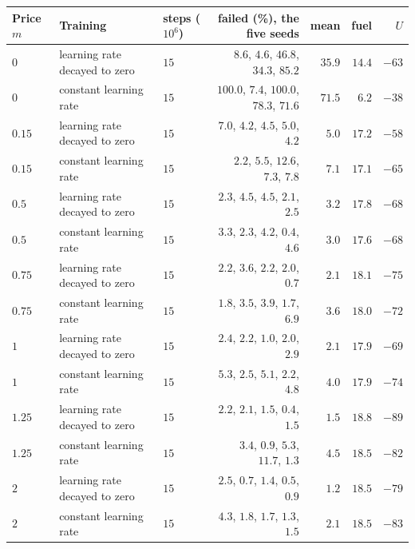\begin{tabular}{lllrrrr}
\toprule
Price $m$ & Training & steps ($10^6$) & failed (\%), the five seeds & mean & fuel & $U$ \\
\midrule
$0$ & learning rate decayed to zero & $15$ & $8.6$, $4.6$, $46.8$, $34.3$, $85.2$ & $35.9$ & $14.4$ & $-63$ \\
$0$ & constant learning rate & $15$ & $100.0$, $7.4$, $100.0$, $78.3$, $71.6$ & $71.5$ & $6.2$ & $-38$ \\
$0.15$ & learning rate decayed to zero & $15$ & $7.0$, $4.2$, $4.5$, $5.0$, $4.2$ & $5.0$ & $17.2$ & $-58$ \\
$0.15$ & constant learning rate & $15$ & $2.2$, $5.5$, $12.6$, $7.3$, $7.8$ & $7.1$ & $17.1$ & $-65$ \\
$0.5$ & learning rate decayed to zero & $15$ & $2.3$, $4.5$, $4.5$, $2.1$, $2.5$ & $3.2$ & $17.8$ & $-68$ \\
$0.5$ & constant learning rate & $15$ & $3.3$, $2.3$, $4.2$, $0.4$, $4.6$ & $3.0$ & $17.6$ & $-68$ \\
$0.75$ & learning rate decayed to zero & $15$ & $2.2$, $3.6$, $2.2$, $2.0$, $0.7$ & $2.1$ & $18.1$ & $-75$ \\
$0.75$ & constant learning rate & $15$ & $1.8$, $3.5$, $3.9$, $1.7$, $6.9$ & $3.6$ & $18.0$ & $-72$ \\
$1$ & learning rate decayed to zero & $15$ & $2.4$, $2.2$, $1.0$, $2.0$, $2.9$ & $2.1$ & $17.9$ & $-69$ \\
$1$ & constant learning rate & $15$ & $5.3$, $2.5$, $5.1$, $2.2$, $4.8$ & $4.0$ & $17.9$ & $-74$ \\
$1.25$ & learning rate decayed to zero & $15$ & $2.2$, $2.1$, $1.5$, $0.4$, $1.5$ & $1.5$ & $18.8$ & $-89$ \\
$1.25$ & constant learning rate & $15$ & $3.4$, $0.9$, $5.3$, $11.7$, $1.3$ & $4.5$ & $18.5$ & $-82$ \\
$2$ & learning rate decayed to zero & $15$ & $2.5$, $0.7$, $1.4$, $0.5$, $0.9$ & $1.2$ & $18.5$ & $-79$ \\
$2$ & constant learning rate & $15$ & $4.3$, $1.8$, $1.7$, $1.3$, $1.5$ & $2.1$ & $18.5$ & $-83$ \\
\bottomrule
\end{tabular}
